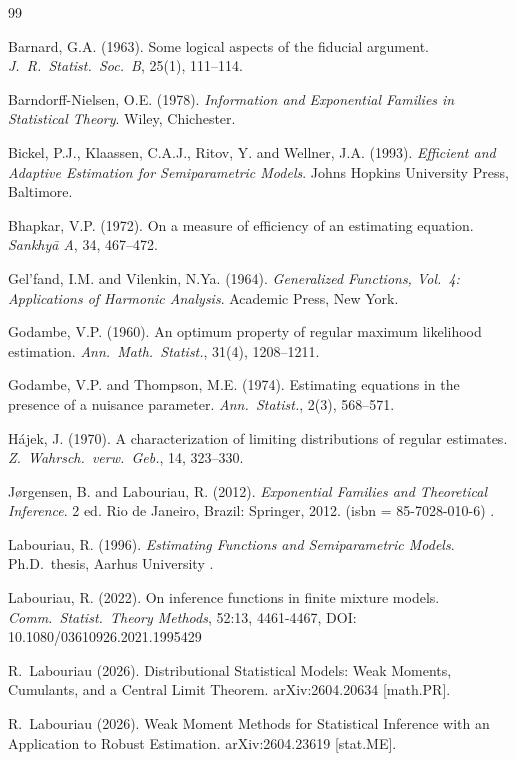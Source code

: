 \documentclass[11pt,a4paper]{article}
\begin{document}
\begin{thebibliography}{99}

Barnard, G.A. (1963).
Some logical aspects of the fiducial argument.
\emph{J.\ R.\ Statist.\ Soc.\ B}, 25(1), 111--114.

Barndorff-Nielsen, O.E. (1978).
\emph{Information and Exponential Families in Statistical Theory}.
Wiley, Chichester.

Bickel, P.J., Klaassen, C.A.J., Ritov, Y. and Wellner, J.A. (1993).
\emph{Efficient and Adaptive Estimation for Semiparametric Models}.
Johns Hopkins University Press, Baltimore.

Bhapkar, V.P. (1972).
On a measure of efficiency of an estimating equation.
\emph{Sankhy\={a} A}, 34, 467--472.

Gel'fand, I.M. and Vilenkin, N.Ya. (1964).
\emph{Generalized Functions, Vol.~4: Applications of Harmonic Analysis}.
Academic Press, New York.

Godambe, V.P. (1960).
An optimum property of regular maximum likelihood estimation.
\emph{Ann.\ Math.\ Statist.}, 31(4), 1208--1211.

Godambe, V.P. and Thompson, M.E. (1974).
Estimating equations in the presence of a nuisance parameter.
\emph{Ann.\ Statist.}, 2(3), 568--571.

H\'ajek, J. (1970).
A characterization of limiting distributions of regular estimates.
\emph{Z.\ Wahrsch.\ verw.\ Geb.}, 14, 323--330.

J{\o}rgensen, B. and Labouriau, R. (2012).
\emph{Exponential Families and Theoretical Inference}.
2 ed. Rio de Janeiro, Brazil: Springer, 2012.  
 (isbn = 85-7028-010-6) .

Labouriau, R. (1996).
\emph{Estimating Functions and Semiparametric Models}.
Ph.D.\ thesis, Aarhus University .

Labouriau, R. (2022).
On inference functions in finite mixture models.
\emph{Comm.\ Statist.\ Theory Methods}, 52:13, 4461-4467, DOI: 10.1080/03610926.2021.1995429

R.~Labouriau (2026).
Distributional Statistical Models:
Weak Moments, Cumulants, and a Central Limit Theorem.
arXiv:2604.20634 [math.PR].

R.~Labouriau (2026).
Weak Moment Methods for Statistical Inference
with an Application to Robust Estimation.
arXiv:2604.23619 [stat.ME].


\end{thebibliography}
\end{document}
